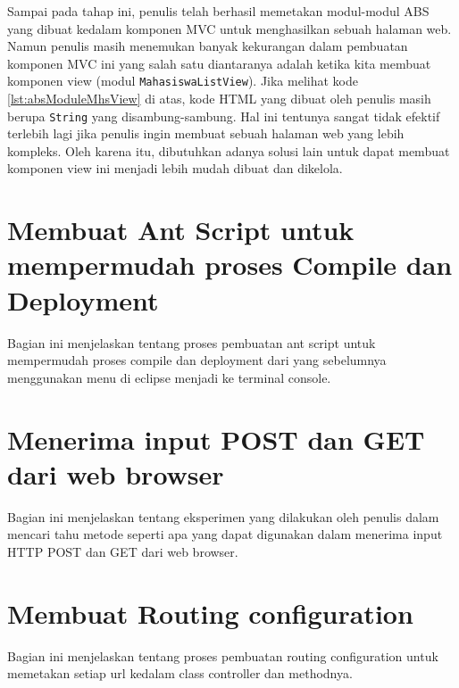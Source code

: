 Sampai pada tahap ini, penulis telah berhasil memetakan modul-modul ABS yang dibuat kedalam komponen MVC untuk menghasilkan sebuah halaman web. Namun penulis masih menemukan banyak kekurangan dalam pembuatan komponen MVC ini yang salah satu diantaranya adalah ketika kita membuat komponen view (modul \texttt{MahasiswaListView}). Jika melihat kode \ref{lst:absModuleMhsView} di atas, kode HTML yang dibuat oleh penulis masih berupa \texttt{String} yang disambung-sambung. Hal ini tentunya sangat tidak efektif terlebih lagi jika penulis ingin membuat sebuah halaman web yang lebih kompleks. Oleh karena itu, dibutuhkan adanya solusi lain untuk dapat membuat komponen view ini menjadi lebih mudah dibuat dan dikelola.

\section{Membuat Ant Script untuk mempermudah proses Compile dan Deployment}
Bagian ini menjelaskan tentang proses pembuatan ant script untuk mempermudah proses compile dan deployment dari yang sebelumnya menggunakan menu di eclipse menjadi ke terminal console.

\section{Menerima input POST dan GET dari web browser}
Bagian ini menjelaskan tentang eksperimen yang dilakukan oleh penulis dalam mencari tahu metode seperti apa yang dapat digunakan dalam menerima input HTTP POST dan GET dari web browser.

\section{Membuat Routing configuration}
Bagian ini menjelaskan tentang proses pembuatan routing configuration untuk memetakan setiap url kedalam class controller dan methodnya.